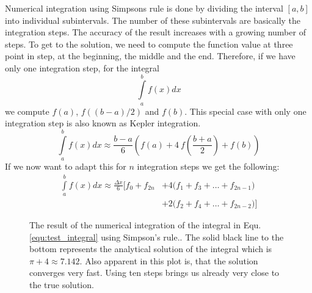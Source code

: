 \documentclass{aa}
\begin{document}
Numerical integration using Simpsons rule is done by dividing the interval \([a,
b]\) into individual subintervals. The number of these subintervals are
basically the integration steps. The accuracy of the result increases with a
growing number of steps. To get to the solution, we need to compute the
function value at three point in step, at the beginning, the middle and the end.
Therefore, if we have only one integration step, for the integral
\begin{equation}
    \int\limits_a^b f(x) dx 
\end{equation}
we compute \(f(a)\), \(f((b-a)/2)\) and \(f(b)\). This special case with only
one integration step is also known as Kepler integration.
\begin{equation}
    \int\limits_a^b f(x) dx \approx \frac{b - a}{6} \left(f(a) + 
    4~f\left(\frac{b + a}{2}\right) + f(b)\right)
\end{equation}
If we now want to adapt this for \(n\) integration steps we get the following:
\begin{equation}
    \label{equ:simpson}
    \begin{split}
        \int\limits_a^b f(x) dx \approx \frac{\Delta x}{6} 
        \bigg[f_0 + f_{2n} & + 4\Big(f_1 + f_3 + \dots + f_{2n-1}\Big) \\
        & + 2\Big(f_2 + f_4 + \dots + f_{2n-2}\Big)\bigg]
    \end{split}
\end{equation}
\begin{figure}[tbp]
    \caption{The result of the numerical integration of the integral in Equ.
    \ref{equ:test_integral} using Simpson's rule.. The solid black line to the 
    bottom represents the analytical solution of the integral which is 
    \(\pi + 4 \approx 7.142\). Also apparent in this plot is, that the solution 
    converges very fast. Using ten steps brings us already very close to the 
    true solution.}
    \label{fig:Simpson_results}
\end{figure}
\end{document}
